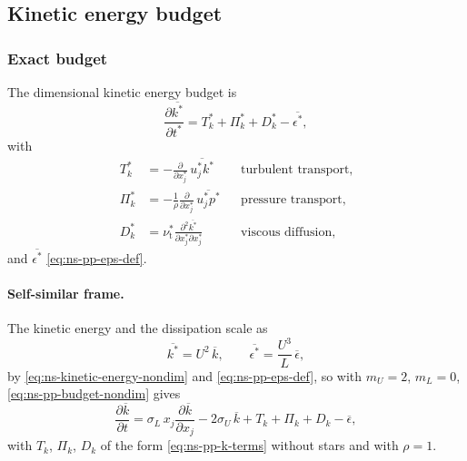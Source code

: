 \documentclass{article}
\begin{document}
\subsection{Kinetic energy budget}\label{ssec:ns-pp-k-budget}
\subsubsection{Exact budget}\label{sssec:ns-pp-k-exact}
The dimensional kinetic energy budget is
\begin{equation}\label{eq:ns-pp-k-rate}
  \frac{\partial \overline{k^*}}{\partial t^*}
  = T_k^* + \Pi_k^* + D_k^* - \overline{\epsilon^*} ,
\end{equation}
with
\begin{equation}\label{eq:ns-pp-k-terms}
\begin{aligned}
  T_k^* &= -\frac{\partial}{\partial x_j^*}\, \overline{u_j^* k^*}
  && \text{turbulent transport,} \\
  \Pi_k^* &= -\frac{1}{\rho} \frac{\partial}{\partial x_j^*}\, \overline{u_j^* p^*}
  && \text{pressure transport,} \\
  D_k^* &= \nu_{\mathrm{t}}^* \frac{\partial^2 \overline{k^*}}{\partial x_j^* \partial x_j^*}
  && \text{viscous diffusion,}
\end{aligned}
\end{equation}
and $\overline{\epsilon^*}$ \eqref{eq:ns-pp-eps-def}. 

\paragraph{Self-similar frame.}
The kinetic energy and the dissipation scale as
\begin{equation}\label{eq:ns-pp-k-scales}
  \overline{k^*} = U^2\, \overline{k} ,
  \qquad
  \overline{\epsilon^*} = \frac{U^3}{L}\, \overline{\epsilon} ,
\end{equation}
by \eqref{eq:ns-kinetic-energy-nondim} and \eqref{eq:ns-pp-eps-def}, so with
$m_U = 2$, $m_L = 0$, \eqref{eq:ns-pp-budget-nondim} gives
\begin{equation}\label{eq:ns-pp-k-rate-nondim}
  \frac{\partial \overline{k}}{\partial t}
  = \sigma_L\, x_j \frac{\partial \overline{k}}{\partial x_j}
  - 2\sigma_U\, \overline{k}
  + T_k + \Pi_k + D_k - \overline{\epsilon} ,
\end{equation}
with $T_k$, $\Pi_k$, $D_k$ of the form \eqref{eq:ns-pp-k-terms} without stars
and with $\rho = 1$.
\end{document}
